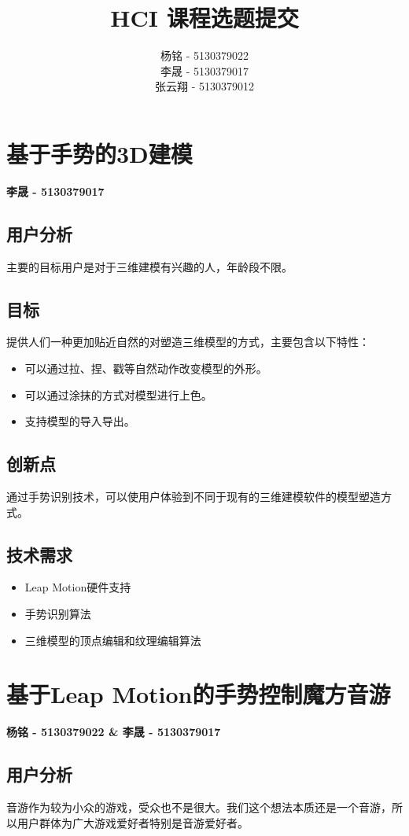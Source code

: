 \documentclass{article} %
\author{杨铭 - 5130379022\\
        李晟 - 5130379017\\
        张云翔 - 5130379012}
\title{HCI 课程选题提交}
\begin{document}
\maketitle
\newpage
\section{基于手势的3D建模}
\textbf{李晟 - 5130379017}
\subsection{用户分析}
主要的目标用户是对于三维建模有兴趣的人，年龄段不限。
\subsection{目标}
提供人们一种更加贴近自然的对塑造三维模型的方式，主要包含以下特性：
\begin{itemize}
	\item 可以通过拉、捏、戳等自然动作改变模型的外形。
	\item 可以通过涂抹的方式对模型进行上色。
	\item 支持模型的导入导出。
\end{itemize}
\subsection{创新点}
通过手势识别技术，可以使用户体验到不同于现有的三维建模软件的模型塑造方式。
\subsection{技术需求}
\begin{itemize}
	\item Leap Motion硬件支持
	\item 手势识别算法
	\item 三维模型的顶点编辑和纹理编辑算法
\end{itemize}
\newpage
\section{基于Leap Motion的手势控制魔方音游}
\textbf{杨铭 - 5130379022 \& 李晟 - 5130379017}
\subsection{用户分析}
音游作为较为小众的游戏，受众也不是很大。我们这个想法本质还是一个音游，所以用户群体为广大游戏爱好者特别是音游爱好者。
\end{document}
